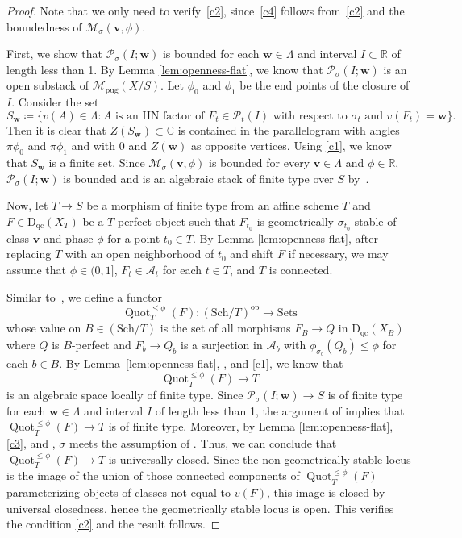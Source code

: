 \documentclass[11pt, reqno]{amsart}
\numberwithin{equation}{section}
\theoremstyle{plain}
\theoremstyle{remark}
\theoremstyle{definition}
\theoremstyle{italicsname}
\newcommand{\bv}{\mathbf{v}}
\newcommand{\bw}{\mathbf{w}}
\newcommand{\Dqc}{\mathrm{D}_{\mathrm{qc}}}
\DeclareMathOperator{\Quot}{Quot}
\newcommand{\cM}{\mathcal{M}}
\newcommand{\cA}{\mathscr{A}}
\newcommand{\cP}{\mathscr{P}}
\def\CC{\ensuremath{\mathbb{C}}}
\def\RR{\ensuremath{\mathbb{R}}}
\begin{document}
\begin{proof}
Note that we only need to verify~\ref{c2}, since~\ref{c4} follows from~\ref{c2} and the boundedness of $\cM_{{\sigma}}(\bv,\phi)$.

First, we show that $\cP_{{\sigma}}(I;\bw)$ is bounded for each $\bw\in \Lambda$ and interval $I\subset \RR$ of length less than 1. By Lemma \ref{lem:openness-flat}, we know that $\cP_{{\sigma}}(I;\bw)$ is an open substack of $\cM_{\mathrm{pug}}(X/S)$. Let $\phi_0$ and $\phi_1$ be the end points of the closure of $I$. Consider the set
\[
S_{\bw}\coloneqq \{v(A)\in \Lambda\colon A\text{ is an HN factor of } F_t\in \cP_t(I) \text{ with respect to } \sigma_t \text{ and } v(F_t)=\bw\}.
\]
Then it is clear that $Z(S_{\bw})\subset \CC$ is contained in the parallelogram with angles $\pi\phi_0$ and $\pi\phi_1$ and with $0$ and $Z(\bw)$ as opposite vertices. Using \ref{c1}, we know that $S_{\bw}$ is a finite set. 
Since $\cM_{{\sigma}}(\bv,\phi)$ is bounded for every $\bv\in \Lambda$ and $\phi\in \RR$, $\cP_{{\sigma}}(I;\bw)$ is bounded and is an algebraic stack of finite type over $S$ by~\cite[Lemma 9.5 and Lemma 9.6]{stability-families}.

Now, let $T\to S$ be a morphism of finite type from an affine scheme $T$ and $F\in \Dqc(X_T)$ be a $T$-perfect object such that $F_{t_0}$ is geometrically $\sigma_{t_0}$-stable of class $\bv$ and phase $\phi$ for a point $t_0\in T$. 
By Lemma \ref{lem:openness-flat}, after replacing $T$ with an open neighborhood of $t_0$ and shift $F$ if necessary, we may assume that $\phi\in (0,1]$, $F_t\in \cA_{t}$ for each $t\in T$, and $T$ is connected.

Similar to~\cite[Lemma 21.21]{stability-families}, we define a functor
\[
\Quot_T^{\leq \phi}(F)\colon (\mathrm{Sch}/T)^{\mathrm{op}}\to \mathrm{Sets}
\]
whose value on $B\in (\mathrm{Sch}/T)$ is the set of all morphisms $F_B\to Q$ in $\Dqc(X_B)$ where $Q$ is $B$-perfect and $F_b\to Q_b$ is a surjection in $\cA_b$ with $\phi_{\sigma_b}(Q_b)\leq \phi$ for each $b\in B$. 
By Lemma~\ref{lem:openness-flat}, \cite[Proposition 11.6]{stability-families}, and \ref{c1}, we know that $$\Quot_T^{\leq \phi}(F)\to T$$ is an algebraic space locally of finite type. 
Since $\cP_{{\sigma}}(I;\bw)\to S$ is of finite type for each $\bw\in \Lambda$ and interval $I$ of length less than 1, the argument of \cite[Lemma 21.21]{stability-families} implies that $\Quot_T^{\leq \phi}(F)\to T$ is of finite type. Moreover, by Lemma \ref{lem:openness-flat}, \ref{c3}, and \cite[Theorem 17.1]{stability-families}, ${\sigma}$ meets the assumption of \cite[Proposition 11.11]{stability-families}. 
Thus, we can conclude that $\Quot_T^{\leq \phi}(F)\to T$ is universally closed. 
Since the non-geometrically stable locus is the image of the union of those connected components of $\Quot_T^{\leq \phi}(F)$ parameterizing objects of classes not equal to $v(F)$, this image is closed by universal closedness, hence the geometrically stable locus is open. 
This verifies the condition \ref{c2} and the result follows.
\end{proof}
\end{document}
